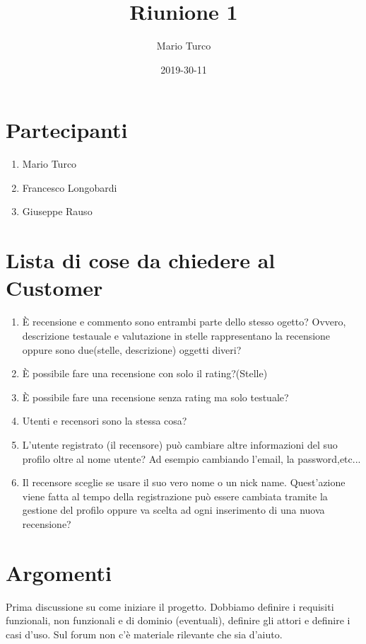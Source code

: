 \documentclass{article}
\title{Riunione 1}
\date{2019-30-11}
\author{Mario Turco}
\begin{document}
\maketitle
{}
\newpage
{}
\section{Partecipanti}
\begin{enumerate}
    \item Mario Turco
    \item Francesco Longobardi  
    \item Giuseppe Rauso
\end{enumerate}
\section{Lista di cose da chiedere al Customer}
\begin{enumerate}
    \item È recensione e commento sono entrambi parte dello stesso ogetto? Ovvero, descrizione testauale e valutazione in stelle rappresentano la recensione oppure sono due(stelle, descrizione) oggetti diveri?
    \item È possibile fare una recensione con solo il rating?(Stelle)
    \item È possibile fare una recensione senza rating ma solo testuale?
    \item Utenti e recensori sono la stessa cosa?
    \item L'utente registrato (il recensore) può cambiare altre informazioni del suo profilo oltre al nome utente? Ad esempio cambiando l'email, la password,etc...
    \item Il recensore sceglie se usare il suo vero nome o un nick name. Quest'azione viene fatta al tempo della registrazione può essere cambiata tramite la gestione del profilo oppure va scelta ad ogni inserimento di una nuova recensione?
\end{enumerate}

\section{Argomenti}

Prima discussione su come iniziare il progetto.
Dobbiamo definire i requisiti funzionali, non funzionali e di dominio (eventuali), definire gli attori e definire i casi d'uso.
Sul forum non c'è materiale rilevante che sia d'aiuto.
\end{document}
